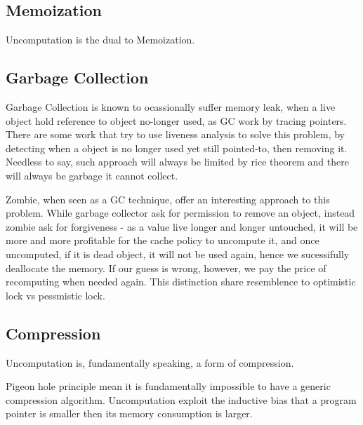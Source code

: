 \subsection{Memoization}
Uncomputation is the dual to Memoization.
\subsection{Garbage Collection}
Garbage Collection is known to ocassionally suffer memory leak, when a live object hold reference to object no-longer used, as GC work by tracing pointers. There are some work that try to use liveness analysis to solve this problem, by detecting when a object is no longer used yet still pointed-to, then removing it. Needless to say, such approach will always be limited by rice theorem and there will always be garbage it cannot collect.

Zombie, when seen as a GC technique, offer an interesting approach to this problem. While garbage collector ask for permission to remove an object, instead zombie ask for forgiveness - as a value live longer and longer untouched, it will be more and more profitable for the cache policy to uncompute it, and once uncomputed, if it is dead object, it will not be used again, hence we sucessifully deallocate the memory. If our guess is wrong, however, we pay the price of recomputing when needed again. This distinction share resemblence to optimistic lock vs pessmistic lock.
\subsection{Compression}
Uncomputation is, fundamentally speaking, a form of compression.

Pigeon hole principle mean it is fundamentally impossible to have a generic compression algorithm. Uncomputation exploit the inductive bias that a program pointer is smaller then its memory consumption is larger.
